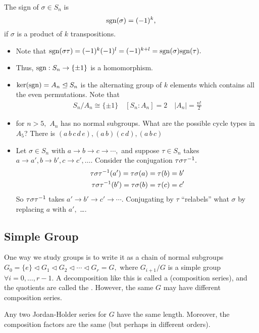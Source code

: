 \documentclass[a4paper]{article}
\begin{document}
\begin{definition}[Sign]
    The sign of $\sigma\in S_n$ is \begin{equation}
        \mathrm{sgn}(\sigma)=(-1)^k,
    \end{equation}
    if $\sigma$ is a product of $k$ transpositions. 
\end{definition}
\begin{itemize}
    \item Note that $\mathrm{sgn}(\sigma\tau)=(-1)^k(-1)^l=(-1)^{k+l}=\mathrm{sgn}(\sigma)\mathrm{sgn}(\tau).$
    \item Thus, $\mathrm{sgn}:S_n\to\{\pm1\}$ is a homomorphism.
    \item $\ker(\mathrm{sgn})=A_n\trianglelefteq S_n$ is the alternating group of $k$ elements which contains all the even permutations. Note that
    \begin{align}
        S_n/A_n\cong\{\pm1\}\quad[S_n:A_n]=2\quad|A_n|=\frac{n!}{2}
    \end{align}
    \item for $n>5,$ $A_n$ has no normal subgroups. What are the possible cycle types in $A_5$? There is $(a\,b\,c\,d\,e),(a\,b)(c\,d),(a\,b\,c)$
    \item Let $\sigma\in S_n$ with $a\to b\to c\to\cdots,$ and suppose $\tau\in S_n$ takes $a\to a',b\to b',c\to c',\dots.$ Consider the conjugation $\tau\sigma\tau^{-1}.$\begin{align}
        \tau\sigma\tau^{-1}(a')=\tau\sigma(a)=\tau(b)=b'\\
        \tau\sigma\tau^{-1}(b')=\tau\sigma(b)=\tau(c)=c'\\
    \end{align}
    So $\tau\sigma\tau^{-1}$ takes $a'\to b'\to c'\to\cdots.$ Conjugating by $\tau$ ``relabels'' what $\sigma$ by replacing $a$ with $a',$ \dots.
\end{itemize}
\subsection{Simple Group}
One way we study groups is to write it as a chain of normal subgroups $G_0=\{e\}\triangleleft G_1\triangleleft G_2\triangleleft\cdots\triangleleft G_r=G,$ where $G_{i+1}/G$ is a simple group $\forall i=0,\dots,r-1.$ A decomposition like this is called a  (composition series), and the quotients are called the . However, the same $G$ may have different composition series. \begin{theorem}
    Any two Jordan-Holder series for $G$ have the same length. Moreover, the composition factors are the same (but perhaps in different orders).
\end{theorem}
\end{document}
